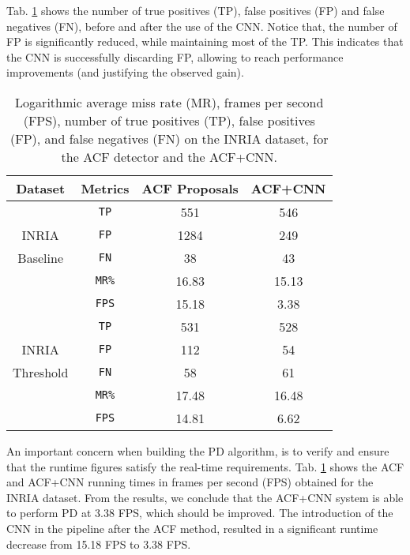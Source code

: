 \documentclass[5p,time]{elsarticle}
\begin{document}
Tab. \ref{tab:Analysis_FP} shows the number of true positives (TP), false positives (FP) and false negatives (FN), before and after the use of the CNN. Notice that, the number of FP is significantly reduced, while maintaining most of the TP. This indicates that the CNN is successfully discarding FP, allowing to reach performance improvements (and justifying the observed gain).

\begin{table}\caption{Logarithmic average miss rate (MR), frames per second (FPS), number of true positives (TP), false positives (FP), and  false negatives (FN) on the INRIA dataset, for the ACF detector and the ACF+CNN.}\label{tab:Analysis_FP}
	\begin{center}
		\begin{tabular}{|c|c|c|c|}
			\hline{\bf  Dataset}  &  {\bf  Metrics}  &  {\bf ACF Proposals}  &  {\bf ACF+CNN}
			\\ \hline
			
			&       \texttt{TP}    &   551   &  546      \\
			INRIA &  \texttt{FP}   &  1284   &  249      \\
			Baseline &\texttt{FN}  &   38    &  43      \\
			&        \texttt{MR\%} &  16.83	&  15.13	\\
			&        \texttt{FPS}  & 15.18	& 3.38  	\\			
			
			\hline
			&       \texttt{TP}    &   531   &  528      \\
			INRIA &  \texttt{FP}   &   112   &  54      \\
			Threshold &\texttt{FN} &   58    &  61      \\
			& \texttt{MR\%}  &  17.48	&  16.48	\\			
			&        \texttt{FPS} & 14.81	& 6.62 	\\
			
			\hline
		\end{tabular}
	\end{center}
\end{table}

An important concern when building the PD algorithm, is to verify and ensure that the runtime figures satisfy the real-time requirements. Tab. \ref{tab:Analysis_FP}
shows the ACF and ACF+CNN running times in frames per second (FPS) obtained for the INRIA dataset.
From the results, we conclude that the ACF+CNN system is able to perform PD at 3.38 FPS, which should be improved. The introduction of the CNN in the pipeline after the ACF method, resulted in a significant runtime decrease from 15.18 FPS to 3.38 FPS.
\end{document}
